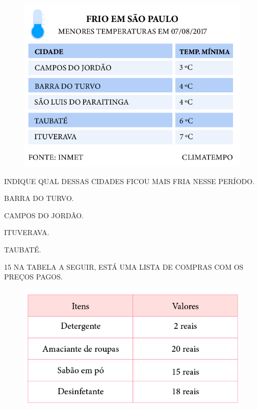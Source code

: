 \begin{figure}[htpb!]
\includegraphics[width=\textwidth]{./media/SAEB_1ANO_MAT_FIGURA119.png}
\end{figure}

INDIQUE QUAL DESSAS CIDADES FICOU MAIS FRIA NESSE PERÍODO.

\begin{escolha}[itemsep=0pt]
\item BARRA DO TURVO.

\item CAMPOS DO JORDÃO.

\item ITUVERAVA.

\item TAUBATÉ.
\end{escolha}

\pagebreak
\num{15} NA TABELA A SEGUIR, ESTÁ UMA LISTA DE COMPRAS COM OS PREÇOS PAGOS.

\begin{figure}[htpb!]
\includegraphics[width=\textwidth]{./media/SAEB_1ANO_MAT_FIGURA120.png}
\end{figure}

